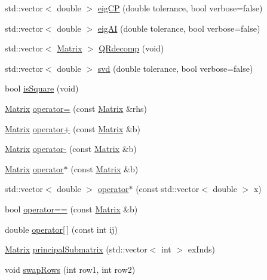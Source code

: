 \begin{DoxyCompactItemize}
std\+::vector$<$ double $>$ \mbox{\hyperlink{class_matrix_a2df4b81dc518abc9fcd6896e2dafdff0}{eig\+CP}} (double tolerance, bool verbose=false)
\item 
std\+::vector$<$ double $>$ \mbox{\hyperlink{class_matrix_a107beca4305d735f074f6cb6ef97dbc9}{eig\+AI}} (double tolerance, bool verbose=false)
\item 
std\+::vector$<$ \mbox{\hyperlink{class_matrix}{Matrix}} $>$ \mbox{\hyperlink{class_matrix_ae7c92ceca24b8ca00926c93180c4cc24}{Q\+Rdecomp}} (void)
\item 
std\+::vector$<$ double $>$ \mbox{\hyperlink{class_matrix_a9fd5f24302f779d7341fdd06bb23bb90}{svd}} (double tolerance, bool verbose=false)
\item 
bool \mbox{\hyperlink{class_matrix_ae67c274d2425c1323a3a3356c174d071}{is\+Square}} (void)
\item 
\mbox{\hyperlink{class_matrix}{Matrix}} \mbox{\hyperlink{class_matrix_a0355fb02a7719e9b81938702eae3abe2}{operator=}} (const \mbox{\hyperlink{class_matrix}{Matrix}} \&rhs)
\item 
\mbox{\hyperlink{class_matrix}{Matrix}} \mbox{\hyperlink{class_matrix_ab5df6e16d56f931d712dc3b739f3e56d}{operator+}} (const \mbox{\hyperlink{class_matrix}{Matrix}} \&b)
\item 
\mbox{\hyperlink{class_matrix}{Matrix}} \mbox{\hyperlink{class_matrix_ae9f9af2349c3f6520a75116ceba73a77}{operator-\/}} (const \mbox{\hyperlink{class_matrix}{Matrix}} \&b)
\item 
\mbox{\hyperlink{class_matrix}{Matrix}} \mbox{\hyperlink{class_matrix_ac17891c37c77aabb69f2b82e15befb4d}{operator$\ast$}} (const \mbox{\hyperlink{class_matrix}{Matrix}} \&b)
\item 
std\+::vector$<$ double $>$ \mbox{\hyperlink{class_matrix_a049af5ca6904481796a79f94d8cbef31}{operator$\ast$}} (const std\+::vector$<$ double $>$ x)
\item 
bool \mbox{\hyperlink{class_matrix_a9094eaa5bbb1bdf4fb1811dfd163effb}{operator==}} (const \mbox{\hyperlink{class_matrix}{Matrix}} \&b)
\item 
double \mbox{\hyperlink{class_matrix_a0a5a42b681f5ea018e1bc6b6453b86e2}{operator\mbox{[}$\,$\mbox{]}}} (const int ij)
\item 
\mbox{\hyperlink{class_matrix}{Matrix}} \mbox{\hyperlink{class_matrix_a98b1c60f665125f2da72069314794820}{principal\+Submatrix}} (std\+::vector$<$ int $>$ ex\+Inds)
\item 
void \mbox{\hyperlink{class_matrix_a3d028bc7d149b4f87c847cf0ff50aa18}{swap\+Rows}} (int row1, int row2)

\end{DoxyCompactItemize}
